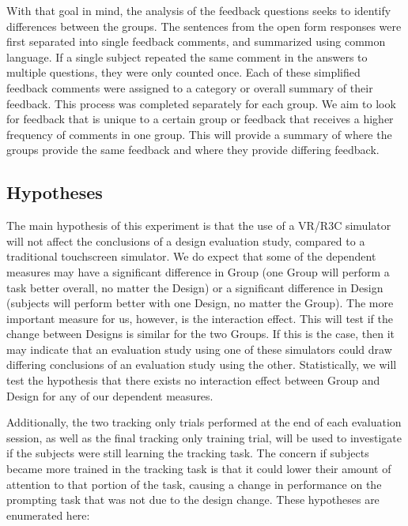 With that goal in mind, the analysis of the feedback questions seeks to identify differences between the groups.
The sentences from the open form responses were first separated into single feedback comments, and summarized using common language.
If a single subject repeated the same comment in the answers to multiple questions, they were only counted once.
Each of these simplified feedback comments were assigned to a category or overall summary of their feedback.
This process was completed separately for each group.
We aim to look for feedback that is unique to a certain group or feedback that receives a higher frequency of comments in one group.
This will provide a summary of where the groups provide the same feedback and where they provide differing feedback.

\subsection{Hypotheses}
\label{sec:de_hypotheses}

The main hypothesis of this experiment is that the use of a VR/R3C simulator will not affect the conclusions of a design evaluation study, compared to a traditional touchscreen simulator.
We do expect that some of the dependent measures may have a significant difference in Group (one Group will perform a task better overall, no matter the Design) or a significant difference in Design (subjects will perform better with one Design, no matter the Group).
The more important measure for us, however, is the interaction effect.
This will test if the change between Designs is similar for the two Groups.
If this is the case, then it may indicate that an evaluation study using one of these simulators could draw differing conclusions of an evaluation study using the other.
Statistically, we will test the hypothesis that there exists no interaction effect between Group and Design for any of our dependent measures.

Additionally, the two tracking only trials performed at the end of each evaluation session, as well as the final tracking only training trial, will be used to investigate if the subjects were still learning the tracking task.
The concern if subjects became more trained in the tracking task is that it could lower their amount of attention to that portion of the task, causing a change in performance on the prompting task that was not due to the design change.
These hypotheses are enumerated here:

